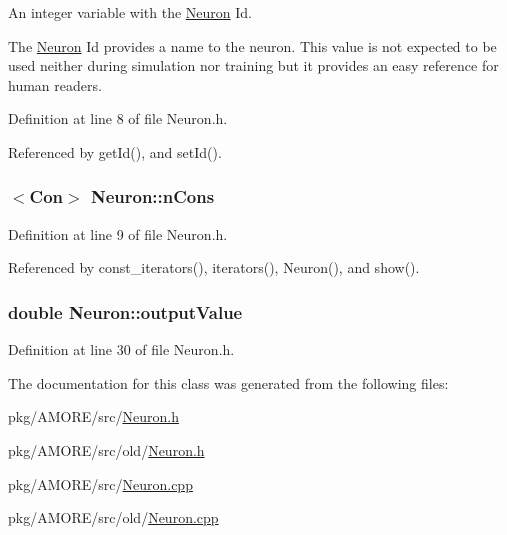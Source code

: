 An integer variable with the \hyperlink{class_neuron}{Neuron} Id. 

The \hyperlink{class_neuron}{Neuron} Id provides a name to the neuron. This value is not expected to be used neither during simulation nor training but it provides an easy reference for human readers. 

Definition at line 8 of file Neuron.h.



Referenced by getId(), and setId().

\hypertarget{class_neuron_a43be99a10c4508a8f7f3182129a3ab21}{
\subsubsection[{nCons}]{$<${\bf Con}$>$ {\bf Neuron::nCons}}}
\label{class_neuron_a43be99a10c4508a8f7f3182129a3ab21}


Definition at line 9 of file Neuron.h.



Referenced by const\_\-iterators(), iterators(), Neuron(), and show().

\hypertarget{class_neuron_ada029047646c36e525a6a1b77cafc03c}{
\subsubsection[{outputValue}]{\setlength{\rightskip}{0pt plus 5cm}double {\bf Neuron::outputValue}}}
\label{class_neuron_ada029047646c36e525a6a1b77cafc03c}


Definition at line 30 of file Neuron.h.



The documentation for this class was generated from the following files:\begin{DoxyCompactItemize}
\item 
pkg/AMORE/src/\hyperlink{_neuron_8h}{Neuron.h}\item 
pkg/AMORE/src/old/\hyperlink{old_2_neuron_8h}{Neuron.h}\item 
pkg/AMORE/src/\hyperlink{_neuron_8cpp}{Neuron.cpp}\item 
pkg/AMORE/src/old/\hyperlink{old_2_neuron_8cpp}{Neuron.cpp}\end{DoxyCompactItemize}
